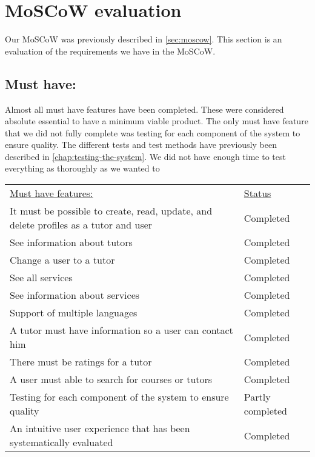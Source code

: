 \section{MoSCoW evaluation}
Our MoSCoW was previously described in \autoref{sec:moscow}. 
This section is an evaluation of the requirements we have in the MoSCoW.

\subsection{Must have:}
Almost all must have features have been completed.
These were considered absolute essential to have a minimum viable product. 
The only must have feature that we did not fully complete was testing for each component of the system to ensure quality.
The different tests and test methods have previously been described in \autoref{chap:testing-the-system}.
We did not have enough time to test everything as thoroughly as we wanted to

\begin{table}[h]
    \begin{tabularx}{\textwidth}{|X|l|}
    \underline{Must have features:}                                                                   & \underline{Status} \\
    It must be possible to create, read, update, and delete profiles as a tutor and user              & Completed \\
    See information about tutors                                                                      & Completed \\
    Change a user to a tutor                                                                          & Completed \\
    See all services                                                                                  & Completed \\
    See information about services                                                                    & Completed \\
    Support of multiple languages                                                                     & Completed \\
    A tutor must have information so a user can contact him                                           & Completed \\
    There must be ratings for a tutor                                                                 & Completed \\
    A user must able to search for courses or tutors                                                  & Completed \\
    Testing for each component of the system to ensure quality                                        & Partly completed \\
    An intuitive user experience that has been systematically evaluated                               & Completed \\
    \end{tabularx}
\end{table}

